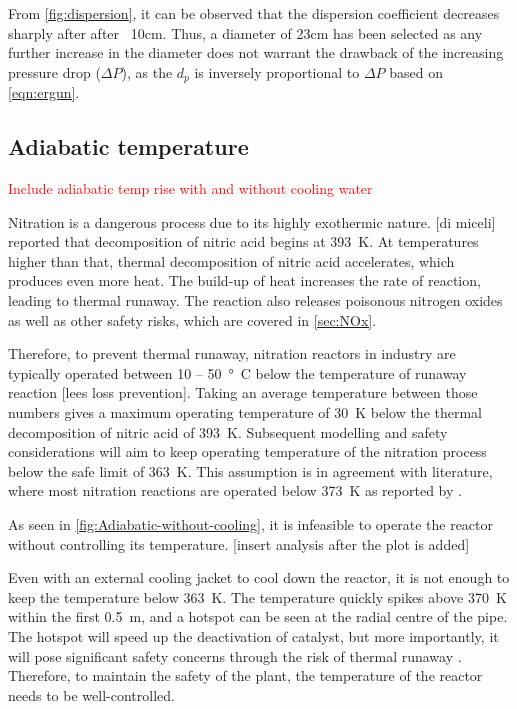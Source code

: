 From \cref{fig:dispersion}, it can be observed that the dispersion coefficient decreases sharply after after ~10cm. Thus, a diameter of 23cm has been selected as any further increase in the diameter does not warrant the drawback of the increasing pressure drop ($\Delta P$), as the $d_p$ is inversely proportional to $\Delta P$ based on \cref{eqn:ergun}.


\subsection{Adiabatic temperature}

\textcolor{red}{Include adiabatic temp rise with and without cooling water}

Nitration is a dangerous process due to its highly exothermic nature. [di miceli] reported that decomposition of nitric acid begins at \SI{393}{\K}. At temperatures higher than that, thermal decomposition of nitric acid accelerates, which produces even more heat. The build-up of heat increases the rate of reaction, leading to thermal runaway. The reaction also releases poisonous nitrogen oxides as well as other safety risks, which are covered in \cref{sec:NOx}. 

Therefore, to prevent thermal runaway, nitration reactors in industry are typically operated between \si{10} – \SI{50}{°C} below the temperature of runaway reaction [lees loss prevention]. Taking an average temperature between those numbers gives a maximum operating temperature of \SI{30}{\K} below the thermal decomposition of nitric acid of \SI{393}{\K}. Subsequent modelling and safety considerations will aim to keep operating temperature of the nitration process below the safe limit of \SI{363}{\K}. This assumption is in agreement with literature, where most nitration reactions are operated below \SI{373}{\K} as reported by \textcite{chen_experimental_1998}.

As seen in \cref{fig:Adiabatic-without-cooling}, it is infeasible to operate the reactor without controlling its temperature. [insert analysis after the plot is added]

Even with an external cooling jacket to cool down the reactor, it is not enough to keep the temperature below \SI{363}{\K}. The temperature quickly spikes above \SI{370}{\K} within the first \SI{0.5}{\m}, and a hotspot can be seen at the radial centre of the pipe. The hotspot will speed up the deactivation of catalyst, but more importantly, it will pose significant safety concerns through the risk of thermal runaway \cite{nguyen_flow_1994}. Therefore, to maintain the safety of the plant, the temperature of the reactor needs to be well-controlled.

